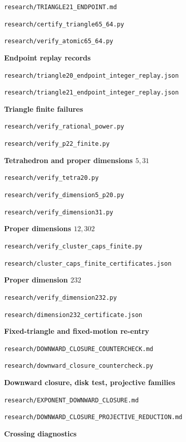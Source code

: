 \documentclass[11pt]{article}
\theoremstyle{definition}
\newcommand{\pathcode}[1]{\nolinkurl{#1}}
\begin{document}
\pathcode{research/TRIANGLE21_ENDPOINT.md}\par
\pathcode{research/certify_triangle65_64.py}\par
\pathcode{research/verify_atomic65_64.py}\par\medskip
\noindent\textbf{Endpoint replay records}\par\nopagebreak[4]
\pathcode{research/triangle20_endpoint_integer_replay.json}\par
\pathcode{research/triangle21_endpoint_integer_replay.json}\par\medskip
\noindent\textbf{Triangle finite failures}\par\nopagebreak[4]
\pathcode{research/verify_rational_power.py}\par
\pathcode{research/verify_p22_finite.py}\par\medskip
\noindent\textbf{Tetrahedron and proper dimensions $5,31$}\par\nopagebreak[4]
\pathcode{research/verify_tetra20.py}\par
\pathcode{research/verify_dimension5_p20.py}\par
\pathcode{research/verify_dimension31.py}\par\medskip
\noindent\textbf{Proper dimensions $12,302$}\par\nopagebreak[4]
\pathcode{research/verify_cluster_caps_finite.py}\par
\pathcode{research/cluster_caps_finite_certificates.json}\par\medskip
\noindent\textbf{Proper dimension $232$}\par\nopagebreak[4]
\pathcode{research/verify_dimension232.py}\par
\pathcode{research/dimension232_certificate.json}\par\medskip
\noindent\textbf{Fixed-triangle and fixed-motion re-entry}\par\nopagebreak[4]
\pathcode{research/DOWNWARD_CLOSURE_COUNTERCHECK.md}\par
\pathcode{research/downward_closure_countercheck.py}\par\medskip
\noindent\textbf{Downward closure, disk test, projective families}\par\nopagebreak[4]
\pathcode{research/EXPONENT_DOWNWARD_CLOSURE.md}\par
\pathcode{research/DOWNWARD_CLOSURE_PROJECTIVE_REDUCTION.md}\par\medskip
\noindent\textbf{Crossing diagnostics}\par\nopagebreak[4]
\end{document}
